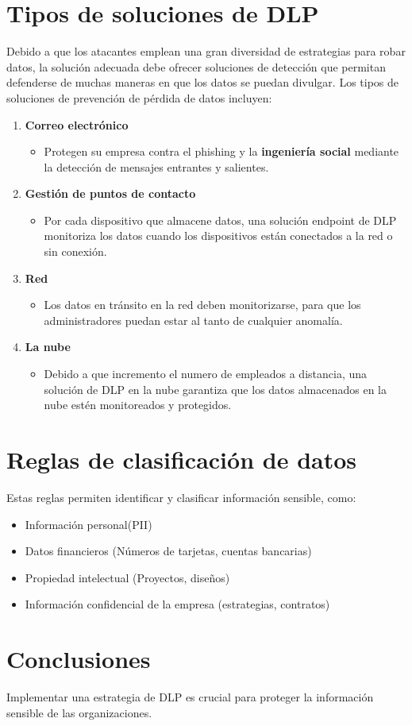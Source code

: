 \documentclass{article}
\begin{document}
	\section{Tipos de soluciones de DLP}
		Debido a que los atacantes emplean una gran diversidad de estrategias para robar datos, la solución adecuada debe ofrecer soluciones de detección que permitan defenderse de muchas maneras en que los datos se puedan divulgar. Los tipos de soluciones de prevención de pérdida de datos incluyen:
	\begin{enumerate}
		\item \textbf{Correo electrónico}
		\begin{itemize}
			\item Protegen su empresa contra el phishing y la \textbf{ingeniería social} mediante la detección de mensajes entrantes y salientes.
		\end{itemize}
		\item \textbf{Gestión de puntos de contacto}
		\begin{itemize}
			\item Por cada dispositivo que almacene datos, una solución endpoint de DLP monitoriza los datos cuando los dispositivos están conectados a la red o sin conexión.
		\end{itemize}
		\item \textbf{Red}
		\begin{itemize}
			\item Los datos en tránsito en la red deben monitorizarse, para que los administradores puedan estar al tanto de cualquier anomalía.
		\end{itemize}
		\item \textbf{La nube}
		\begin{itemize}
			\item Debido a que incremento el numero de empleados a distancia, una solución de DLP en la nube garantiza que los datos almacenados en la nube estén monitoreados y protegidos.
		\end{itemize}
	\end{enumerate}
	
	\section{Reglas de clasificación de datos}
	Estas reglas permiten identificar y clasificar información sensible, como:
	\begin{itemize}
		\item Información personal(PII)
		\item Datos financieros (Números de tarjetas, cuentas bancarias)
		\item Propiedad intelectual (Proyectos, diseños)
		\item Información confidencial de la empresa (estrategias, contratos)
	\end{itemize}
	
	
	\section{Conclusiones}
	Implementar una estrategia de DLP es crucial para proteger la información sensible de las organizaciones.
	
\end{document}
